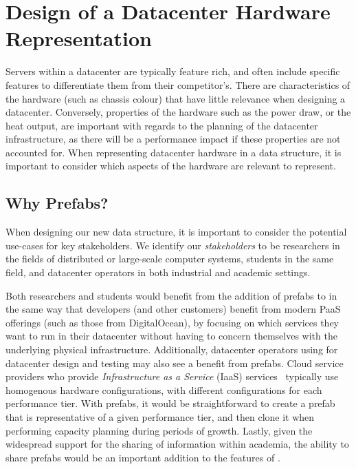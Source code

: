 \documentclass[11pt]{article}
\begin{document}
\newpage

\section{Design of a Datacenter Hardware Representation} \label{sec:design}
	Servers within a datacenter are typically feature rich, and often include specific features to differentiate them from their competitor's.
	There are characteristics of the hardware (such as chassis colour) that have little relevance when designing a datacenter.
	Conversely, properties of the hardware such as the power draw, or the heat output, are important with regards to the planning of the datacenter infrastructure, as there will be a performance impact if these properties are not accounted for.
	When representing datacenter hardware in a data structure, it is important to consider which aspects of the hardware are relevant to represent.
	
	\subsection{Why Prefabs?}
		When designing our new data structure, it is important to consider the potential use-cases for key stakeholders.
		We identify our \textit{stakeholders} to be researchers in the fields of distributed or large-scale computer systems, students in the same field, and datacenter operators in both industrial and academic settings.

		Both researchers and students would benefit from the addition of prefabs to \opendc{} in the same way that developers (and other customers) benefit from modern PaaS offerings (such as those from DigitalOcean), by focusing on which services they want to run in their datacenter without having to concern themselves with the underlying physical infrastructure.
		Additionally, datacenter operators using \opendc{} for datacenter design and testing may also see a benefit from prefabs. 
		Cloud service providers who provide \textit{Infrastructure as a Service} (IaaS) services~\cite{Liu2011} typically use homogenous hardware configurations, with different configurations for each performance tier. 
		With prefabs, it would be straightforward to create a prefab that is representative of a given performance tier, and then clone it when performing capacity planning during periods of growth.
		Lastly, given the widespread support for the sharing of information within academia, the ability to share prefabs would be an important addition to the features of \opendc{}.
\end{document}
